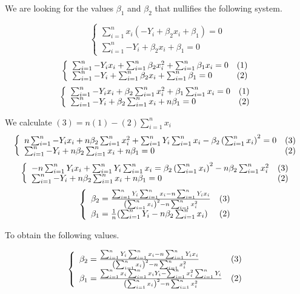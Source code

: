 \documentclass[
	12pt, %
]{article}
\theoremstyle{definition}
\begin{document}
We are looking for the values $\beta_1$ and $\beta_2$ that nullifies the following system.

$$
\left\{
\begin{array}{l}
\sum_{i=1}^{n}{x_i(-Y_i+\beta_2x_i+\beta_1)} = 0 \\
\sum_{i=1}^{n}{-Y_i+\beta_2x_i+\beta_1} = 0
\end{array}
\right.
$$
$$
\left\{
\begin{array}{l l}
\sum_{i=1}^{n}{-Y_ix_i}+\sum_{i=1}^{n}{\beta_2x_i^2}+\sum_{i=1}^{n}{\beta_1x_i} = 0 & (1)\\
\sum_{i=1}^{n}{-Y_i} +\sum_{i=1}^{n}{\beta_2x_i}+\sum_{i=1}^{n}{\beta_1} = 0 & (2)
\end{array}
\right.
$$
$$
\left\{
\begin{array}{l l}
\sum_{i=1}^{n}{-Y_ix_i}+\beta_2\sum_{i=1}^{n}{x_i^2}+\beta_1\sum_{i=1}^{n}{x_i} = 0 & (1)\\
\sum_{i=1}^{n}{-Y_i} +\beta_2\sum_{i=1}^{n}{x_i}+n\beta_1 = 0 & (2)
\end{array}
\right.
$$

\bigskip
We calculate $(3) = n(1)-(2)\sum_{i=1}^{n}{x_i}$
$$
\left\{
\begin{array}{l l}
n\sum_{i=1}^{n}{-Y_ix_i}+n\beta_2\sum_{i=1}^{n}{x_i^2}+\sum_{i=1}^{n}{Y_i}\sum_{i=1}^{n}{x_i} -\beta_2\left(\sum_{i=1}^{n}{x_i}\right)^2 = 0 & (3)\\
\sum_{i=1}^{n}{-Y_i} +n\beta_2\sum_{i=1}^{n}{x_i}+n\beta_1 = 0 & (2)
\end{array}
\right.
$$
$$
\left\{
\begin{array}{l l}
-n\sum_{i=1}^{n}{Y_ix_i} + \sum_{i=1}^{n}{Y_i}\sum_{i=1}^{n}{x_i} = \beta_2\left(\sum_{i=1}^{n}{x_i}\right)^2 -n\beta_2\sum_{i=1}^{n}{x_i^2}  & (3)\\
\sum_{i=1}^{n}{-Y_i} +n\beta_2\sum_{i=1}^{n}{x_i}+n\beta_1 = 0 & (2)
\end{array}
\right.
$$
$$
\left\{
\begin{array}{l l}
\beta_2 = \frac{\sum_{i=1}^{n}{Y_i}\sum_{i=1}^{n}{x_i}-n\sum_{i=1}^{n}{Y_ix_i}}{\left(\sum_{i=1}^{n}{x_i}\right)^2 -n\sum_{i=1}^{n}{x_i^2}}  & (3)\\
\beta_1 = \frac{1}{n}(\sum_{i=1}^{n}{Y_i} - n\beta_2\sum_{i=1}^{n}{x_i}) & (2)
\end{array}
\right.
$$

\bigskip
To obtain the following values.

$$
\left\{
\begin{array}{l l}
\beta_2 = \frac{\sum_{i=1}^{n}{Y_i}\sum_{i=1}^{n}{x_i}-n\sum_{i=1}^{n}{Y_ix_i}}{\left(\sum_{i=1}^{n}{x_i}\right)^2 -n\sum_{i=1}^{n}{x_i^2}}  & (3)\\
\beta_1 = \frac{\sum_{i=1}^{n}{x_i}\sum_{i=1}^{n}{x_iY_i}-\sum_{i=1}^{n}{x_i^2}\sum_{i=1}^{n}{Y_i}}{\left(\sum_{i=1}^{n}{x_i}\right)^2 -n\sum_{i=1}^{n}{x_i^2}} & (2)
\end{array}
\right.
$$
\end{document}
